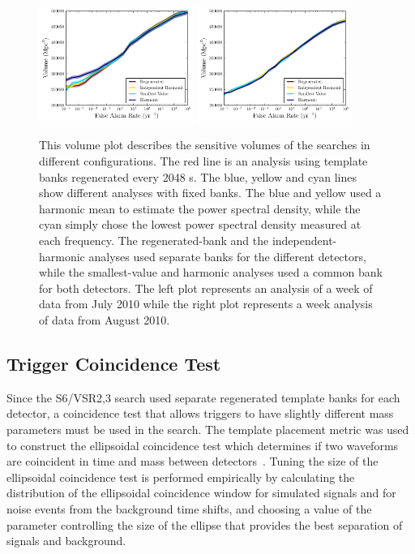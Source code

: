 \documentclass[12pt]{iopart} \usepackage{graphicx,amssymb}
\begin{document}
\begin{figure}[t!bp]	
\begin{center}
\includegraphics[width=0.45\textwidth]{figures/volume_plots/compare_psd_average_w1_volume.pdf}
\includegraphics[width=0.45\textwidth]{figures/volume_plots/compare_psd_average_w2_volume.pdf}
\caption{This volume plot describes the sensitive volumes of the searches in
different configurations. The red line is an analysis using template banks
regenerated every 2048 s. The blue, yellow and cyan lines show different
analyses with fixed banks. The blue and yellow used a harmonic mean to
estimate the power spectral density, while the cyan simply chose the lowest power spectral density measured at each
frequency. The regenerated-bank and the independent-harmonic analyses used
separate banks for the different detectors, while the smallest-value and
harmonic analyses used a common bank for both detectors. The left plot
represents an analysis of a week of data from July 2010 while the right plot represents a week
analysis of data from August 2010.}
\label{fig:ave}
\end{center}
\end{figure}

\subsection{Trigger Coincidence Test}
\label{s:coinc}

Since the S6/VSR2,3 search used separate regenerated template banks for each
detector, a coincidence test that allows triggers to have slightly different
mass parameters must be used in the search. The template placement metric was
used to construct the ellipsoidal coincidence test which determines if two
waveforms are coincident in time and mass between
detectors~\cite{Robinson:2008un}. Tuning the size of the ellipsoidal
coincidence test is performed empirically by calculating the distribution of
the ellipsoidal coincidence window for simulated signals and for noise events
from the background time shifts, and choosing a value of the parameter
controlling the size of the ellipse that provides the best separation of
signals and background. 
\end{document}
